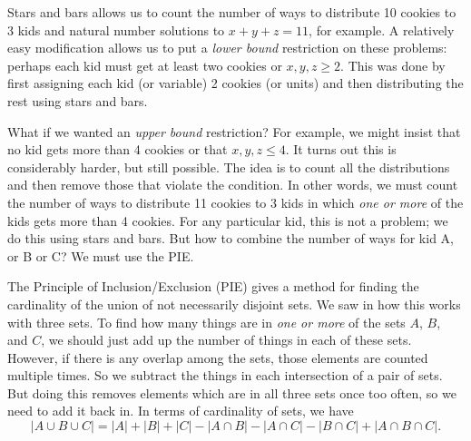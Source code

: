 \documentclass[12pt]{article}
\begin{document}
Stars and bars allows us to count the number of ways to distribute 10 cookies to 3 kids and natural number solutions to $x+y+z = 11$, for example.  A relatively easy modification allows us to put a \emph{lower bound} restriction on these problems: perhaps each kid must get at least two cookies or $x,y,z \ge 2$.  This was done by first assigning each kid (or variable) 2 cookies (or units) and then distributing the rest using stars and bars.

What if we wanted an \emph{upper bound} restriction?  For example, we might insist that no kid gets more than 4 cookies or that $x, y, z \le 4$.  It turns out this is considerably harder, but still possible.  The idea is to count all the distributions and then remove those that violate the condition.  In other words, we must count the number of ways to distribute 11 cookies to 3 kids in which \emph{one or more} of the kids gets more than 4 cookies.  For any particular kid, this is not a problem; we do this using stars and bars.  But how to combine the number of ways for kid A, or B or C?  We must use the PIE.


The Principle of Inclusion/Exclusion (PIE) gives a method for finding the cardinality of the union of not necessarily disjoint sets.  We saw in  how this works with three sets.  To find how many things are in \emph{one or more} of the sets $A$, $B$, and $C$, we should just add up the number of things in each of these sets.  However, if there is any overlap among the sets, those elements are counted multiple times.  So we subtract the things in each intersection of a pair of sets.  But doing this removes elements which are in all three sets once too often, so we need to add it back in.  In terms of cardinality of sets, we have
\[|A \cup B \cup C| = |A| + |B| + |C| - |A \cap B| - |A \cap C| - |B \cap C| + |A\cap B \cap C|.\]
\end{document}
